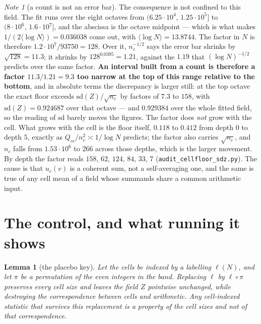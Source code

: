 \documentclass[11pt,a4paper]{article}
\theoremstyle{plain}
\newtheorem{lemma}[theorem]{Lemma}
\theoremstyle{definition}
\theoremstyle{remark}
\newtheorem{note}[theorem]{Note}
\begin{document}
\begin{note}[a count is not an error bar]\label{note:notanerrorbar}
The consequence is not confined to this field. The fit runs over the
eight octaves from $(6.25\cdot10^4,\,1.25\cdot10^5]$ to
$(8\cdot10^6,\,1.6\cdot10^7]$, and the abscissa is the octave midpoint
--- which is what makes $1/(2\langle\log N\rangle)=0.036038$ come out,
with $\langle\log N\rangle=13.8744$. The factor in $N$ is therefore
$1.2\cdot10^7/93750=128$. Over it, $n_c^{-1/2}$ says the error
bar shrinks by $\sqrt{128}=11.3$; it shrinks by $128^{0.0395}=1.21$,
against the $1.19$ that $(\log N)^{-1/2}$ predicts over the same
factor. \textbf{An interval built from a count is therefore a factor
$11.3/1.21=9.3$ too narrow at the top of this range relative to the
bottom}, and in absolute terms the
discrepancy is larger still: at the top octave the exact floor exceeds
$\mathrm{sd}(Z)/\sqrt{n_c}$ by factors of $7.3$ to $158$, with
$\mathrm{sd}(Z)=0.924687$ over that octave --- and $0.929384$ over the
whole fitted field, so the reading of $\mathrm{sd}$ barely moves the
figures. The factor does \emph{not} grow with the cell. What grows with
the cell is the floor itself, $0.118$ to $0.412$ from depth $0$ to
depth $5$, exactly as $Q_{cc}/n_c^2\asymp1/\log N$ predicts; the factor
also carries $\sqrt{n_c}$, and $n_c$ falls from $1.53\cdot10^6$ to
$266$ across those depths, which is the larger movement. By depth the
factor reads $158$, $62$, $124$, $84$, $33$, $7$
(\texttt{audit\_cellfloor\_sdz.py}). The cause
is that $u_c(v)$ is a coherent sum, not a self-averaging one, and the
same is true of any cell mean of a field whose summands share a common
arithmetic input.
\end{note}

\section{The control, and what running it shows}\label{sec:placebo}

\begin{lemma}[the placebo key]\label{lem:placebo}
Let the cells be indexed by a labelling $\ell(N)$, and let $\pi$ be a
permutation of the even integers in the band. Replacing $\ell$ by
$\ell\circ\pi$ preserves every cell size and leaves the field $Z$
pointwise unchanged, while destroying the correspondence between cells
and arithmetic. Any cell-indexed statistic that survives this
replacement is a property of the cell sizes and not of that
correspondence.
\end{lemma}
\end{document}

